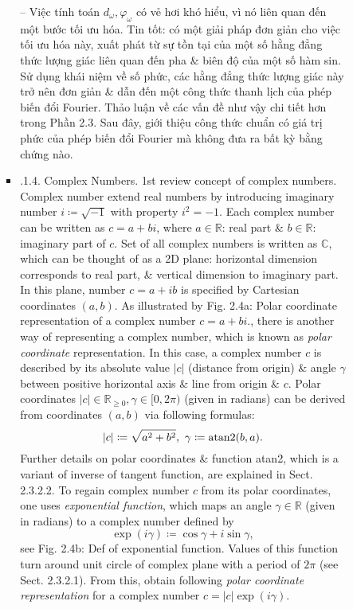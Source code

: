 \documentclass{article}
\begin{document}
\begin{itemize}
\begin{itemize}
\begin{itemize}
\begin{itemize}
				-- Việc tính toán $d_\omega,\varphi_\omega$ có vẻ hơi khó hiểu, vì nó liên quan đến một bước tối ưu hóa. Tin tốt: có một giải pháp đơn giản cho việc tối ưu hóa này, xuất phát từ sự tồn tại của một số hằng đẳng thức lượng giác liên quan đến pha \& biên độ của một số hàm sin. Sử dụng khái niệm về số phức, các hằng đẳng thức lượng giác này trở nên đơn giản \& dẫn đến một công thức thanh lịch của phép biến đổi Fourier. Thảo luận về các vấn đề như vậy chi tiết hơn trong Phần 2.3. Sau đây, giới thiệu công thức chuẩn có giá trị phức của phép biến đổi Fourier mà không đưa ra bất kỳ bằng chứng nào.
				\item {.1.4. Complex Numbers.} 1st review concept of complex numbers. Complex number extend real numbers by introducing imaginary number $i\coloneqq\sqrt{-1}$ with property $i^2 = -1$. Each complex number can be written as $c = a + bi$, where $a\in\mathbb{R}$: real part \& $b\in\mathbb{R}$: imaginary part of $c$. Set of all complex numbers is written as $\mathbb{C}$, which can be thought of as a 2D plane: horizontal dimension corresponds to real part, \& vertical dimension to imaginary part. In this plane, number $c = a + ib$ is specified by Cartesian coordinates $(a,b)$. As illustrated by {\sf Fig. 2.4a: Polar coordinate representation of a complex number $c = a + bi$.}, there is another way of representing a complex number, which is known as {\it polar coordinate} representation. In this case, a complex number $c$ is described by its absolute value $|c|$ (distance from origin) \& angle $\gamma$ between positive horizontal axis \& line from origin \& $c$. Polar coordinates $|c|\in\mathbb{R}_{\ge0},\gamma\in[0,2\pi)$ (given in radians) can be derived from coordinates $(a,b)$ via following formulas:
				\begin{equation*}
					|c|\coloneqq\sqrt{a^2 + b^2},\ \gamma\coloneqq{\rm atan2}(b,a).
				\end{equation*}
				Further details on polar coordinates \& function atan2, which is a variant of inverse of tangent function, are explained in Sect. 2.3.2.2. To regain complex number $c$ from its polar coordinates, one uses {\it exponential function}, which maps an angle $\gamma\in\mathbb{R}$ (given in radians) to a complex number defined by
				\begin{equation*}
					\exp(i\gamma)\coloneqq\cos\gamma + i\sin\gamma,
				\end{equation*}
				see {\sf Fig. 2.4b: Def of exponential function.} Values of this function turn around unit circle of complex plane with a period of $2\pi$ (see Sect. 2.3.2.1). From this, obtain following {\it polar coordinate representation} for a complex number $c = |c|\exp(i\gamma)$.

\end{itemize}
\end{itemize}
\end{itemize}
\end{itemize}
\end{document}
